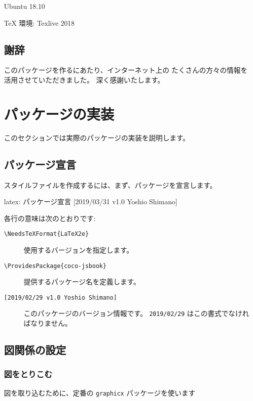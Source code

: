 \documentclass[dvipdfmx,a4j,14pt,uplatex,openany]{jsbook}
\begin{document}
\begin{description}
\item[{OS}] Ubuntu 18.10
\item \TeX{} 環境: Texlive 2018
\end{description}

\section{謝辞}
\label{sec:orgfd9a86b}
このパッケージを作るにあたり、インターネット上の
たくさんの方々の情報を活用させていただきました。
深く感謝いたします。

\chapter{パッケージの実装}
\label{sec:orgc12e06f}
このセクションでは実際のパッケージの実装を説明します。

\section{パッケージ宣言}
\label{sec:orgc7c8f83}
スタイルファイルを作成するには、まず、パッケージを宣言します。

\begin{programlist}[label={org00b8f68}]{latex}{: パッケージ宣言}
   [2019/03/31 v1.0 Yoshio Shimano]
\def\FileVerjou#1{\gdef\@FileVerjou{#1}}
\end{programlist}

各行の意味は次のとおりです:

\begin{description}
\item[{\texttt{\textbackslash{}NeedsTeXFormat\{LaTeX2e\}}}] 使用するバージョンを指定します。
\item[{\texttt{\textbackslash{}ProvidesPackage\{coco-jsbook\}}}] 提供するパッケージ名を定義します。
\item[{\texttt{[2019/02/29 v1.0 Yoshio Shimano]}}] このパッケージのバージョン情報です。
\texttt{2019/02/29} はこの書式でなければなりません。
\end{description}

\section{図関係の設定}
\label{sec:orgc6b3a61}
\subsection{図をとりこむ}
\label{sec:orgc7347ca}
図を取り込むために、定番の \texttt{graphicx} パッケージを使います
\end{document}
